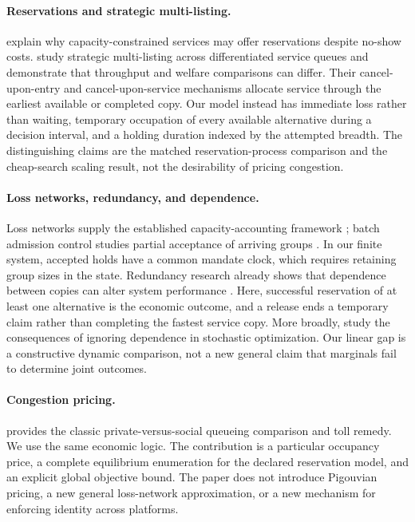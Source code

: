 \documentclass[11pt,a4paper]{article}
\begin{document}
\paragraph{Reservations and strategic multi-listing.}
\citet{alexandrov} explain why capacity-constrained services may offer reservations despite no-show costs. \citet{chen} study strategic multi-listing across differentiated service queues and demonstrate that throughput and welfare comparisons can differ. Their cancel-upon-entry and cancel-upon-service mechanisms allocate service through the earliest available or completed copy. Our model instead has immediate loss rather than waiting, temporary occupation of every available alternative during a decision interval, and a holding duration indexed by the attempted breadth. The distinguishing claims are the matched reservation-process comparison and the cheap-search scaling result, not the desirability of pricing congestion.

\paragraph{Loss networks, redundancy, and dependence.}
Loss networks supply the established capacity-accounting framework \citep{kelly}; batch admission control studies partial acceptance of arriving groups \citep{ormeci}. In our finite system, accepted holds have a common mandate clock, which requires retaining group sizes in the state. Redundancy research already shows that dependence between copies can alter system performance \citep{anton}. Here, successful reservation of at least one alternative is the economic outcome, and a release ends a temporary claim rather than completing the fastest service copy. More broadly, \citet{agrawal} study the consequences of ignoring dependence in stochastic optimization. Our linear gap is a constructive dynamic comparison, not a new general claim that marginals fail to determine joint outcomes.

\paragraph{Congestion pricing.}
\citet{naor} provides the classic private-versus-social queueing comparison and toll remedy. We use the same economic logic. The contribution is a particular occupancy price, a complete equilibrium enumeration for the declared reservation model, and an explicit global objective bound. The paper does not introduce Pigouvian pricing, a new general loss-network approximation, or a new mechanism for enforcing identity across platforms.
\end{document}
